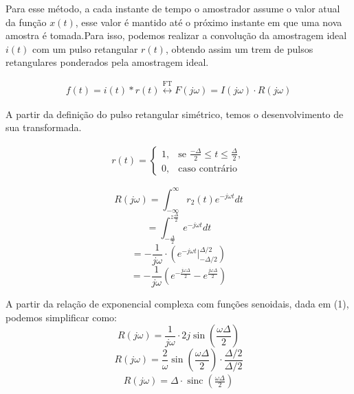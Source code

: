 Para esse método, a cada instante de tempo o amostrador assume o valor atual da função $x(t)$, esse valor é mantido até o próximo instante em que uma nova amostra é tomada.Para isso, podemos realizar a convolução da amostragem ideal $i(t)$ com um pulso retangular $r(t)$, obtendo assim um trem de pulsos retangulares ponderados pela amostragem ideal. 

\begin{align}
    f(t) = i(t) * r(t) \overset{\text{FT}} {\longleftrightarrow} F(j\omega) = I(j\omega) \cdot R(j\omega)
    \label{eq:flattopFT}
\end{align}


A partir da definição do pulso retangular simétrico, temos o desenvolvimento de sua transformada.

\begin{align}
r(t) = 
\begin{cases} 
1, & \text{se } \frac{-\Delta}{2} \leq t \leq \frac{\Delta}{2}, \\ 
0, & \text{caso contrário}
\end{cases}
\end{align}

\begin{equation}
R(j\omega) = \int_{-\infty}^{\infty} r_2(t) e^{-j\omega t}dt
\end{equation}
\begin{equation}
= \int_{-\frac{\Delta}{2}}^{z\frac{\Delta}{2}} e^{-j\omega t}dt
\end{equation}
\begin{equation}
 = -\frac{1}{j\omega}\cdot(e^{-j\omega t} \bigg\rvert_{-\Delta/2}^{\Delta/2})
\end{equation}
\begin{equation}
= -\frac{1}{j\omega}\left(e^{-\frac{j\omega\Delta}{2}}-e^{\frac{j\omega\Delta}{2}}\right)
\end{equation}

A partir da relação de exponencial complexa com funções senoidais, dada em (1), podemos simplificar como:
\begin{equation}
R(j\omega) = \frac{1}{j\omega} \cdot 2j\sin{\left(\frac{\omega\Delta}{2}\right)}
\end{equation}
\begin{equation}
R(j\omega) = \frac{2}{\omega} \sin{\left(\frac{\omega\Delta}{2}\right)} \cdot \frac{\Delta/2}{\Delta/2}
\end{equation}
\begin{align}
    R(j\omega) = \Delta \cdot \operatorname{sinc}\left(\frac{\omega\Delta}{2}\right)
\end{align}

